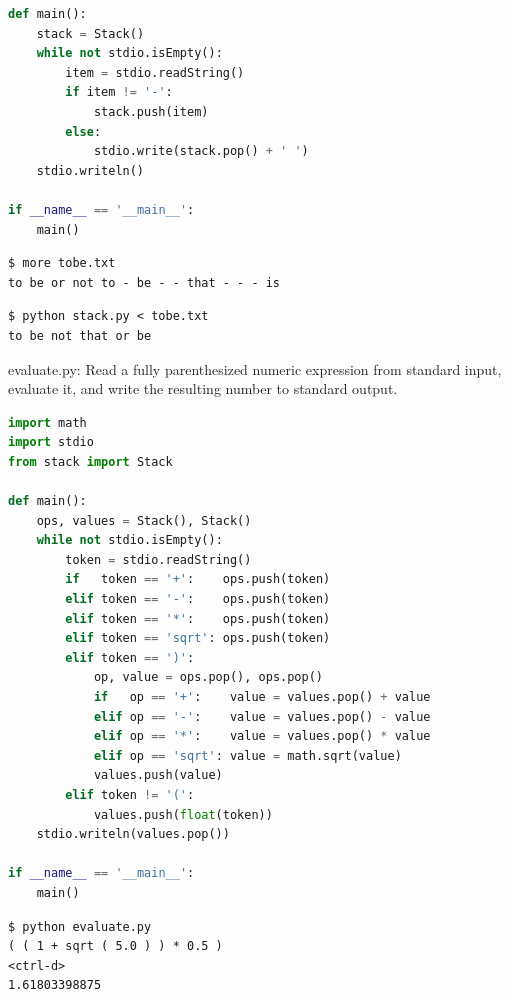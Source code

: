 \documentclass[8pt,a4paper,compress]{beamer}
\begin{document}
\begin{frame}[fragile]
\pause

\begin{lstlisting}[language=Python]
def main():
    stack = Stack()
    while not stdio.isEmpty():
        item = stdio.readString()
        if item != '-':
            stack.push(item)
        else:
            stdio.write(stack.pop() + ' ')
    stdio.writeln()

if __name__ == '__main__':
    main()
\end{lstlisting}

\pause

\begin{lstlisting}[language={}]
$ more tobe.txt
to be or not to - be - - that - - - is
\end{lstlisting}

\pause

\begin{lstlisting}[language={}]
$ python stack.py < tobe.txt 
to be not that or be
\end{lstlisting}
\end{frame}

\begin{frame}[fragile]
\pause

\begin{framed}
\tiny evaluate.py: Read a fully parenthesized numeric expression from standard input, evaluate it, and write the resulting number to standard output.
\end{framed}

\begin{lstlisting}[language=Python]
import math
import stdio
from stack import Stack

def main():
    ops, values = Stack(), Stack()
    while not stdio.isEmpty():
        token = stdio.readString()
        if   token == '+':    ops.push(token)
        elif token == '-':    ops.push(token)
        elif token == '*':    ops.push(token)
        elif token == 'sqrt': ops.push(token)
        elif token == ')':
            op, value = ops.pop(), ops.pop()
            if   op == '+':    value = values.pop() + value
            elif op == '-':    value = values.pop() - value
            elif op == '*':    value = values.pop() * value
            elif op == 'sqrt': value = math.sqrt(value)
            values.push(value)
        elif token != '(':
            values.push(float(token))
    stdio.writeln(values.pop())

if __name__ == '__main__':
    main()
\end{lstlisting}

\pause

\begin{lstlisting}[language={}]
$ python evaluate.py
( ( 1 + sqrt ( 5.0 ) ) * 0.5 )
<ctrl-d>
1.61803398875
\end{lstlisting}
\end{frame}
\end{document}
